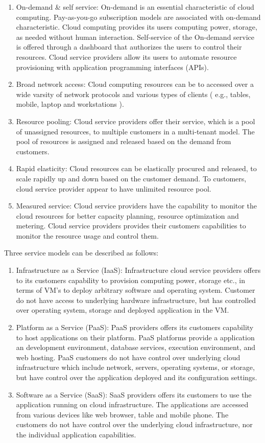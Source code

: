 \begin{enumerate}
  \item On-demand \& self service: On-demand is an essential characteristic of cloud computing. Pay-as-you-go subscription models are associated with on-demand characteristic. Cloud computing provides its users computing power, storage, as needed without human interaction. Self-service of the On-demand service is offered through a dashboard that authorizes the users to control their resources. Cloud service providers allow its users to automate resource provisioning with application programming interfaces (APIs).
  \item Broad network access: Cloud computing resources can be to accessed over a wide varsity of network protocols and various types of clients ( e.g., tables, mobile, laptop and workstations ).
  \item Resource pooling: Cloud service providers offer their service, which is a pool of unassigned resources, to multiple customers in a multi-tenant model. The pool of resources is assigned and released based on the demand from customers.
  \item Rapid elasticity: Cloud resources can be elastically procured and released, to scale rapidly up and down based on the customer demand. To customers, cloud service provider appear to have unlimited resource pool.
  \item Measured service: Cloud service providers have the capability to monitor the cloud resources for better capacity planning, resource optimization and metering. Cloud service providers provides their customers capabilities to monitor the resource usage and control them.
\end{enumerate}
Three service models can be described as follows:
\begin{enumerate}
  \item Infrastructure as a Service (IaaS): Infrastructure cloud service providers offers to its customers capability to provision computing power, storage etc., in terms of VM's to deploy arbitrary software and operating system. Customer do not have access to underlying hardware infrastructure, but has controlled over operating system, storage and deployed application in the VM.
  \item Platform as a Service (PaaS): PaaS providers offers its customers capability to host applications on their platform. PaaS platforms provide a application an development environment, database services, execution environment, and web hosting. PaaS customers do not have control over underlying cloud infrastructure which include network, servers, operating systems, or storage, but have control over the application deployed and its configuration settings.
  \item Software as a Service (SaaS): SaaS providers offers its customers to use the application running on cloud infrastructure. The applications are accessed from various devices like web browser, table and mobile phone. The customers do not have control over the underlying cloud infrastructure, nor the individual application capabilities.
\end{enumerate}

